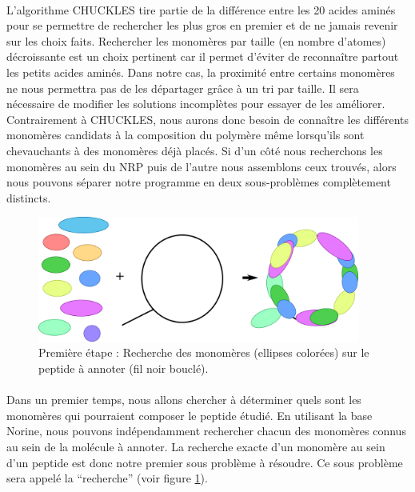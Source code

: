 \documentclass[12pt,french,twoside]{report}
\begin{document}
\paragraph{}L'algorithme CHUCKLES tire partie de la différence entre les 20 acides aminés pour se permettre de rechercher les plus gros en premier et de ne jamais revenir sur les choix faits.
Rechercher les monomères par taille (en nombre d'atomes) décroissante est un choix pertinent car il permet d'éviter de reconnaître partout les petits acides aminés.
Dans notre cas, la proximité entre certains monomères ne nous permettra pas de les départager grâce à un tri par taille.
Il sera nécessaire de modifier les solutions incomplètes pour essayer de les améliorer.
Contrairement à CHUCKLES, nous aurons donc besoin de connaître les différents monomères candidats à la composition du polymère même lorsqu'ils sont chevauchants à des monomères déjà placés.
Si d'un côté nous recherchons les monomères au sein du NRP puis de l'autre nous assemblons ceux trouvés, alors nous pouvons séparer notre programme en deux sous-problèmes complètement distincts.

\begin{figure}[!ht]
  \begin{center}
    \includegraphics[width=400px]{Figures/s2m/Intro/searching.png}
    \caption{\label{search_fig}Première étape : Recherche des monomères (ellipses colorées) sur le peptide à annoter (fil noir bouclé).}
  \end{center}
\end{figure}

\paragraph{}Dans un premier temps, nous allons chercher à déterminer quels sont les monomères qui pourraient composer le peptide étudié.
En utilisant la base Norine, nous pouvons indépendamment rechercher chacun des monomères connus au sein de la molécule à annoter.
La recherche exacte d'un monomère au sein d'un peptide est donc notre premier sous problème à résoudre.
Ce sous problème sera appelé la ``recherche'' (voir figure \ref{search_fig}).
\end{document}
